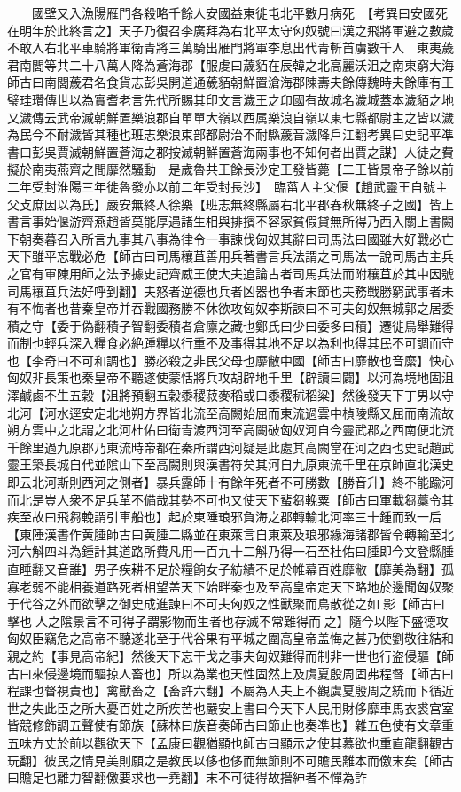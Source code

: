 　　國壁又入漁陽雁門各殺略千餘人安國益東徙屯北平數月病死　【考異曰安國死在明年於此終言之】天子乃復召李廣拜為右北平太守匈奴號曰漢之飛將軍避之數歲不敢入右北平車騎將軍衛青將三萬騎出雁門將軍李息出代青斬首虜數千人　東夷薉君南閭等共二十八萬人降為蒼海郡【服䖍曰薉貊在辰韓之北高麗沃沮之南東窮大海師古曰南閭薉君名食貨志彭吳開道通薉貊朝鮮置滄海郡陳夀夫餘傳魏時夫餘庫有王璧珪瓚傳世以為實耆老言先代所賜其印文言濊王之卬國有故城名濊城蓋本濊貊之地又濊傳云武帝滅朝鮮置樂浪郡自單單大嶺以西属樂浪自嶺以東七縣都尉主之皆以濊為民今不耐濊皆其種也班志樂浪束部都尉治不耐縣薉音濊降戶江翻考異曰史記平凖書曰彭吳賈滅朝鮮置蒼海之郡按滅朝鮮置蒼海兩事也不知何者出賈之謀】人徒之費擬於南夷燕齊之間靡然騷動　是歲魯共王餘長沙定王發皆薨【二王皆景帝子餘以前二年受封淮陽三年徙魯發亦以前二年受封長沙】　臨菑人主父偃【趙武靈王自號主父攴庶因以為氏】嚴安無終人徐樂【班志無終縣屬右北平郡春秋無終子之國】皆上書言事始偃游齊燕趙皆莫能厚遇諸生相與排擯不容家貧假貸無所得乃西入關上書闕下朝奏暮召入所言九事其八事為律令一事諫伐匈奴其辭曰司馬法曰國雖大好戰必亡天下雖平忘戰必危【師古曰司馬穰苴善用兵著書言兵法謂之司馬法一說司馬古主兵之官有軍陳用師之法予據史記齊威王使大夫追論古者司馬兵法而附穰苴於其中因號司馬穰苴兵法好呼到翻】夫怒者逆德也兵者凶器也争者末節也夫務戰勝窮武事者未有不悔者也昔秦皇帝并吞戰國務勝不休欲攻匈奴李斯諫曰不可夫匈奴無城郭之居委積之守【委于偽翻積子智翻委積者倉廪之藏也鄭氏曰少曰委多曰積】遷徙鳥舉難得而制也輕兵深入糧食必絶踵糧以行重不及事得其地不足以為利也得其民不可調而守也【李奇曰不可和調也】勝必殺之非民父母也靡敝中國【師古曰靡散也音縻】快心匈奴非長策也秦皇帝不聽遂使蒙恬將兵攻胡辟地千里【辟讀曰闢】以河為境地固沮澤鹹鹵不生五穀【沮將預翻五穀黍稷菽麥稻或曰黍稷秫稻粱】然後發天下丁男以守北河【河水逕安定北地朔方界皆北流至高闕始屈而東流過雲中楨陵縣又屈而南流故朔方雲中之北謂之北河杜佑曰衛青渡西河至高闕破匈奴河自今靈武郡之西南便北流千餘里過九原郡乃東流時帝都在秦所謂西河疑是此處其高闕當在河之西也史記趙武靈王築長城自代並隂山下至高闕則與漢書符矣其河自九原東流千里在京師直北漢史即云北河斯則西河之側者】暴兵露師十有餘年死者不可勝數【勝音升】終不能踰河而北是豈人衆不足兵革不備哉其勢不可也又使天下蜚芻輓粟【師古曰軍載芻藁令其疾至故曰飛芻輓謂引車船也】起於東陲琅邪負海之郡轉輸北河率三十鍾而致一后【東陲漢書作黄腄師古曰黄腄二縣並在東萊言自東萊及琅邪緣海諸郡皆令轉輸至北河六斛四斗為鍾計其道路所費凡用一百九十二斛乃得一石至杜佑曰腄即今文登縣腄直睡翻又音誰】男子疾耕不足於糧餉女子紡績不足於帷幕百姓靡敝【靡美為翻】孤寡老弱不能相養道路死者相望盖天下始畔秦也及至高皇帝定天下略地於邊聞匈奴聚于代谷之外而欲擊之御史成進諫曰不可夫匈奴之性獸聚而鳥散從之如影【師古曰擊也人之隂景言不可得子謂影物而生者也存滅不常難得而之】隨今以陛下盛德攻匈奴臣竊危之高帝不聽遂北至于代谷果有平城之圍高皇帝盖悔之甚乃使劉敬往結和親之約【事見高帝紀】然後天下忘干戈之事夫匈奴難得而制非一世也行盗侵驅【師古曰來侵邊境而驅掠人畜也】所以為業也天性固然上及虞夏殷周固弗程督【師古曰程課也督視責也】禽獸畜之【畜許六翻】不屬為人夫上不觀虞夏殷周之統而下循近世之失此臣之所大憂百姓之所疾苦也嚴安上書曰今天下人民用財侈靡車馬衣裘宫室皆競修飾調五聲使有節族【蘇林曰族音奏師古曰節止也奏凖也】雜五色使有文章重五味方丈於前以觀欲天下【孟康曰觀猶顯也師古曰顯示之使其慕欲也重直龍翻觀古玩翻】彼民之情見美則願之是教民以侈也侈而無節則不可贍民離本而儌末矣【師古曰贍足也離力智翻儌要求也一堯翻】末不可徒得故搢紳者不憚為詐